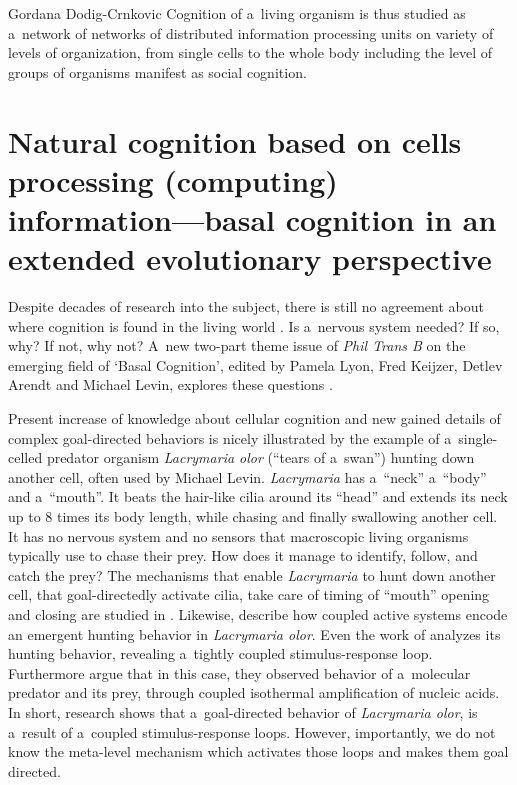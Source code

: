\begin{artengenv}{Gordana Dodig-Crnkovic}
Cognition of a~living organism is thus studied as a~network of networks of distributed information processing units on variety of levels of organization, from single cells to the whole body including the level of groups of organisms manifest as social cognition.

\section*{Natural cognition based on cells processing (computing) information---basal cognition in an extended evolutionary perspective}
Despite decades of research into the subject, there is still no agreement about where cognition is found in the living world
\parencite[][]{ball_book_2022}. %
 Is a~nervous system needed? If so, why? If not, why not? A~new two-part theme issue of \textit{Phil Trans B} on the emerging field of ‘Basal Cognition', edited by Pamela Lyon, Fred Keijzer, Detlev Arendt and Michael Levin, explores these questions 
\parencites[][]{levin_basal_2021}[][]{lyon_basal_2021}.%


Present increase of knowledge about cellular cognition and new gained details of complex goal-directed behaviors is nicely illustrated by the example of a~single-celled predator organism \textit{Lacrymaria olor} (``tears of a~swan'') hunting down another cell, often used by Michael Levin. \textit{Lacrymaria} has a~``neck'' a~``body'' and a~``mouth''. It beats the hair-like cilia around its ``head'' and extends its neck up to 8 times its body length, while chasing and finally swallowing another cell. It has no nervous system and no sensors that macroscopic living organisms typically use to chase their prey. How does it manage to identify, follow, and catch the prey? The mechanisms that enable \textit{Lacrymaria} to hunt down another cell, that goal-directedly activate cilia, take care of timing of ``mouth'' opening and closing are studied in
\parencite[][]{weiss_single-celled_2020}. %
Likewise,
\parencite{coyle_coupled_2019}
describe how coupled active systems encode an emergent hunting behavior in \textit{Lacrymaria olor}. Even the work of 
\parencite[][]{mearns_deconstructing_2020} %
 analyzes its hunting behavior, revealing a~tightly coupled stimulus-response loop. Furthermore 
\parencite[][]{wlotzka_molecular_1997} %
 argue that in this case, they observed behavior of a~molecular predator and its prey, through coupled isothermal amplification of nucleic acids. In short, research shows that a~goal-directed behavior of \textit{Lacrymaria olor}, is a~result of a~coupled stimulus-response loops. However, importantly, we do not know the meta-level mechanism which activates those loops and makes them goal directed.


\end{artengenv}
